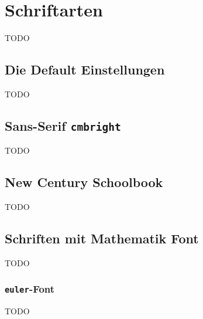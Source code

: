 
\chapter{Schriftarten}
TODO

\section{Die Default Einstellungen}
TODO


\section{Sans-Serif \texttt{cmbright}}
TODO



\section{New Century Schoolbook}

TODO


\section{Schriften mit Mathematik Font}
TODO

\subsection{\texttt{euler}-Font}

TODO
